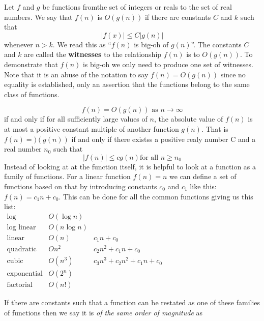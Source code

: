 \begin{definition}
Let $f$ and $g$ be functions fromthe set of integers or reals to the set of real numbers. We say that $f(n)$ is $O(g(n))$ if there are constants $C$ and $k$ such that 
\begin{displaymath}
\lvert f(x)\rvert \le C\lvert g(n)\rvert
\end{displaymath}
whenever $n>k$. We read this as ``$f(n)$ is big-oh of $g(n)$''. The constants $C$ and $k$ are called the \textbf{witnesses} to the relationship $f(n)$ is to $O(g(n))$. To demonstrate that $f(n)$ is big-oh  we only need to produce one set of witnesses. Note that it is an abuse of the notation to say $f(n)=O(g(n))$ since no equality is established, only an assertion that the functions belong to the same class of functions. 
\end{definition}

$$f(n) = O(g(n)) \text{ as } n\rightarrow \infty$$
if and only if for all sufficiently large values of $n$, the absolute value of $f(n)$ is at most a positive constant multiple of another function $g(n)$. That is $f(n)=)(g(n))$ if and only if there existss a positive realy number C and a real number $n_0$ such that
$$\lvert f(n) \rvert \le cg(n) \text{for all } n\ge n_0$$
Instead of looking at at the function itself, it is helpful to look at a function as a family of functions. For a linear function $f(n)=n$ we can define a set of functions based on that by introducing constants $c_0$ and $c_1$ like this: $f(n)=c_1n+c_0$. This can be done for all the common functions giving us this list:\\
$
\begin{array}{lll}
\text{log} &  O (\log n) & \\
\text{log linear} & O(n \log n) & \\
\text{linear} & O(n)& c_1n+c_0\\
\text{quadratic} &On^2& c_2n^2 +c_1n + c_0 \\
\text{cubic}&O(n^3) & c_3n^3 + c_2n^2 + c_1n + c_0\\
\text{exponential} &O(2^n) & \\
\text{factorial} & O(n!) &
\end{array}
$

If there are constants such that a function can be restated as one of these families of functions then we say it is \textit{of the same order of magnitude} as 

